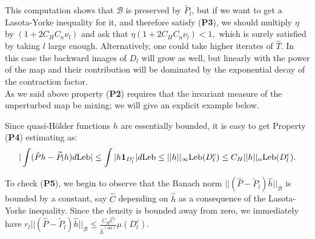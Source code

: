 \documentclass[12pt,reqno,a4paper]{amsart}
\let\tilde\widetilde
\def\Le{\text{Leb}}
\def\P{\hat{P}}
\begin{document}
             This computation shows that $\mathcal{B}$ is preserved by $\tilde{P_l}$, but if we want to get a Lasota-Yorke inequality for it, and therefore satisfy ({\bf P3}), we should multiply $\eta$ by $(1+2C_HC_n\nu_l )$ and ask that $\eta(1+2C_HC_n\nu_l )<1, $ which is surely satisfied by taking $l$ large enough.   Alternatively, one could take higher iterates  of $\hat{T}$. In this case the backward images of $D_l$ will grow as well, but linearly with the power of the map and their contribution will be dominated by the exponential decay of the contraction factor.\\ As we said above property ({\bf P2}) requires that the invariant measure of the unperturbed map be mixing; we will give an explicit example below.

Since  quasi-H\"older functions $h$ are essentially bounded, it is easy to get Property ({\bf P4}) estimating as:
\begin{equation}\label{RC}
|\int (\P h-\tilde{P}_l h)d\Le|\le \int |h{\bf 1}_{D_l^c}|d\Le\le ||h||_{\infty}\Le(D_l^c)\le C_H||h||_{\alpha}\Le(D_l^c).
\end{equation}



  To check ({\bf P5}), we begin to observe that the Banach norm $||(\hat{P}-\tilde{P}_l)\hat{h}||_{\mathcal{B}}$ is bounded by a constant, say $\hat{C}$ depending on $\hat{h}$ as a consequence of the Lasota-Yorke inequality. Since the density is bounded away from zero, we immediately have $r_l ||(\P-\tilde{P}_l)\hat{h}||_{\mathcal{B}}\le \frac{C_H \hat{C}}{\hat{h}^{\mathrm{(inf)}}}\mu(D_l^c).$
\end{document}
